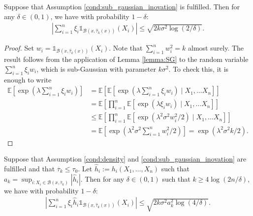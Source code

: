 \begin{proposition}\label{prop:var1}
    Suppose that Assumption \ref{cond:sub_gaussian_inovation} is fulfilled. Then for any $\delta \in (0,1)$, we have with probability $1-\delta$:
    \begin{align*}
        \left| \sum_{i=1} ^n \xi_i \mathds 1 _{ \mathcal{B} (x, \hat \tau_{k} (x) ) } (X_i ) \right|  \leq \sqrt{2 k   \sigma^2 \log(2/\delta)} .
    \end{align*}
\end{proposition}
\begin{proof}
 Set $w_i = \mathds 1 _{ \mathcal{B} (x, \hat  \tau_{k} (x) ) } (X_i )$. Note that $\sum_{i=1} ^n w_i^2 = k$ almost surely. The result follows from the application of Lemma \ref{lemma:SG} to the random variable $ \sum_{i=1} ^n \xi_i w_i$, which is sub-Gaussian with parameter $k \sigma^2$. To check this, it is enough to write
    \begin{align*}
        \mathbb E\left[\exp\left( \lambda  \sum_{i=1} ^n \xi_i w_i \right)\right] &=\mathbb E\left[\mathbb E \left[ \exp\left( \lambda  \sum_{i=1} ^n \xi_i w_i \right)\mid X_1,\ldots X_n\right]\right]\\
        &=\mathbb E\left[ \prod_{i=1} ^n \mathbb E \left[ \exp\left( \lambda \xi_i w_i\right)\mid X_1,\ldots X_n\right]\right]\\
        & \leq \mathbb E\left[ \prod_{i=1} ^n \mathbb E \left[ \exp\left( \lambda^2  \sigma^2 w_i^2 /2 \right)\mid X_1,\ldots X_n\right]\right]\\
        &= \mathbb E\left[   \exp\left( \lambda^2  \sigma^2 \sum_{i=1} ^n w_i^2 /2 \right) \right]=   \exp\left( \lambda^2  \sigma^2 k /2 \right) .
    \end{align*}
\end{proof}

\begin{proposition}\label{prop:var2}
    Suppose that Assumption \ref{cond:density}  and \ref{cond:sub_gaussian_inovation} are fulfilled and that $\overline \tau_{k} \leq \tau_0$. Let $\hat h_i:= h_i(X_1,\ldots,X_n) $ such that $a_k = \sup_{i:X_i\in \mathcal B (x, \overline \tau_k) } |\hat h_i |$. Then for any $\delta \in (0,1)$ such that $ k\geq 4 \log(2n/\delta)   $, we have with probability $1-\delta$: 
        \begin{align*}
        \left| \sum_{i=1} ^n \xi_i \hat h_i \mathds 1 _{ \mathcal{B} (x, \hat \tau_{k} (x) ) } (X_i ) \right|  \leq \sqrt{2 k\sigma^2 a_k^2  \log(4/\delta)} .
    \end{align*}
\end{proposition}

